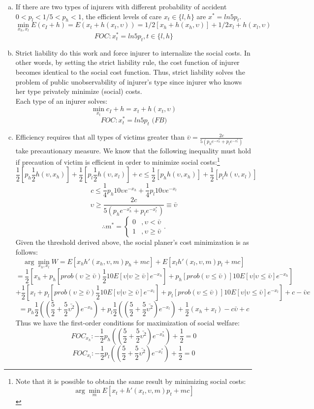 \documentclass[12pt,english]{article}%
\begin{document}
\begin{enumerate}[(a)]
		\item If there are two types of injurers with different probability of accident $0<p_l<1/5<p_h<1$, the efficient levels of care $x_t\in\{l,h\}$ are $x^*=ln5p_t$. 
			$$\min_{x_h, x_l} E(c_I+h)=E(x_t+h(x_t,\upsilon))=1/2[x_h+h(x_h,\upsilon)]+1/2{x_l+h(x_l,\upsilon)}$$
			$$ FOC: x^*_t=ln5p_t , t \in \{l,h\}$$
		\item Strict liability do this work and force injurer to internalize the social costs. In other words, by setting the strict liability rule, the cost function of injurer becomes identical to the social cost function. Thus, strict liability solves the problem of public unobservability of injurer's type since injurer who knows her type privately minimize (social) costs. 
	    \\ Each type of an injurer solves:
		$$\min_{x{_t}} c_I+h=x_t+h(x_t,\upsilon)$$
			$$ FOC: x^*_t=ln5p_t \textit{ (FB)}$$ 
		\item Efficiency requires that all types of victims greater than $\bar{\upsilon}=\frac{2c}{5(p_he^{-x_h^*}+p_le^{-x_l^*})}$ take precautionary measure. We know that the following inequality must hold if precaution of victim is efficient in order to minimize social costs:\footnote{Note that it is possible to obtain the same result by minimizing social costs: $$\arg\min_{m}E[x_t+h'(x_t,\upsilon,m)p_t+mc]$$ } 
		$$\frac{1}{2}[p_h\frac{1}{2}h(\upsilon,x_h)]+\frac{1}{2}[p_l\frac{1}{2}h(\upsilon,x_l)]+c\leq\frac{1}{2}[p_hh(\upsilon,x_h)]+\frac{1}{2}[p_lh(\upsilon,x_l)]$$
		$$c\leq\frac{1}{4}p_h10\upsilon{e^{-x_h}}+\frac{1}{4}p_l10\upsilon{e^{-x_l}}$$
		$$\upsilon\geq\frac{2c}{5(p_he^{-x_h^*}+p_le^{-x_l^*})}\equiv\bar{\upsilon}$$
		$$\therefore m^*= \begin{cases}
            0 &, \upsilon<\bar{\upsilon} \\
            1 &, \upsilon\geq \bar{\upsilon}
          \end{cases}.$$
		Given the threshold derived above, the social planer's cost minimization is as follows:
		$$\arg\min_{x_h,x_l}W=E[x_hh'(x_h, \upsilon,m)p_h+mc]+E[x_lh'(x_l, \upsilon,m)p_l+mc]$$
		$$= \frac{1}{2}[x_h+p_h[prob(\upsilon\geq\bar{\upsilon})\frac{1}{2}10E[\upsilon|\upsilon\geq\bar{\upsilon}]e^{-x_h}]+ p_h[prob(\upsilon\leq\bar{\upsilon})]10E[\upsilon|\upsilon\leq\bar{\upsilon}]e^{-x_h}]$$
		$$+\frac{1}{2}[x_l+p_l[prob(\upsilon\geq\bar{\upsilon})\frac{1}{2}10E[\upsilon|\upsilon\geq\bar{\upsilon}]e^{-x_l}]+ p_l[prob(\upsilon\leq\bar{\upsilon})]10E[\upsilon|\upsilon\leq\bar{\upsilon}]e^{-x_l}]+c-\bar{\upsilon}c$$
		$$=p_h\frac{1}{2}((\frac{5}{2}+\frac{5}{2}\bar{\upsilon^2})e^{-x_h})+p_l\frac{1}{2}((\frac{5}{2}+\frac{5}{2}\bar{\upsilon^2})e^{-x_l})+\frac{1}{2}(x_h+x_l)-c\bar{\upsilon}+c$$
		Thus we have the first-order conditions for maximization of social welfare:
		$$FOC_{x_h}:-\frac{1}{2}p_h((\frac{5}{2}+\frac{5}{2}\bar{\upsilon^2})e^{-x_h^*})+\frac{1}{2}=0$$
		$$FOC_{x_l}:-\frac{1}{2}p_l((\frac{5}{2}+\frac{5}{2}\bar{\upsilon^2})e^{-x_l^*})+\frac{1}{2}=0$$
   					

\end{enumerate}
\end{document}

